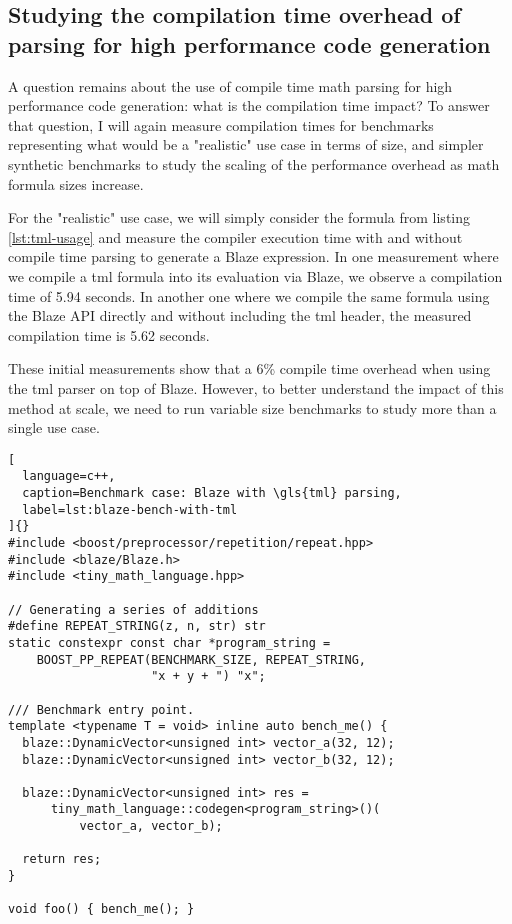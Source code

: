 \documentclass[../main]{subfiles}
\begin{document}
\subsection{
  Studying the compilation time overhead of parsing
  for high performance code generation
}

A question remains about the use of compile time math parsing
for high performance code generation: what is the compilation time impact?
To answer that question, I will again measure compilation times for benchmarks
representing what would be a "realistic" use case in terms of size,
and simpler synthetic benchmarks to study the scaling of the
performance overhead as math formula sizes increase.


For the "realistic" use case, we will simply consider the formula from
listing \ref{lst:tml-usage} and measure the compiler execution time
with and without compile time parsing to generate a Blaze expression.
In one measurement where we compile a \gls{tml} formula into its evaluation
via Blaze, we observe a compilation time of 5.94 seconds.
In another one where we compile the same formula using the Blaze API directly
and without including the \gls{tml} header, the measured compilation time is
5.62 seconds.

These initial measurements show that a 6\% compile time overhead when using
the \gls{tml} parser on top of Blaze.
However, to better understand the impact of this method at scale,
we need to run variable size benchmarks to study more than a single use case.

\clearpage%

\begin{lstlisting}[
  language=c++,
  caption=Benchmark case: Blaze with \gls{tml} parsing,
  label=lst:blaze-bench-with-tml
]{}
#include <boost/preprocessor/repetition/repeat.hpp>
#include <blaze/Blaze.h>
#include <tiny_math_language.hpp>

// Generating a series of additions
#define REPEAT_STRING(z, n, str) str
static constexpr const char *program_string =
    BOOST_PP_REPEAT(BENCHMARK_SIZE, REPEAT_STRING,
                    "x + y + ") "x";

/// Benchmark entry point.
template <typename T = void> inline auto bench_me() {
  blaze::DynamicVector<unsigned int> vector_a(32, 12);
  blaze::DynamicVector<unsigned int> vector_b(32, 12);

  blaze::DynamicVector<unsigned int> res =
      tiny_math_language::codegen<program_string>()(
          vector_a, vector_b);

  return res;
}

void foo() { bench_me(); }
\end{lstlisting}
\end{document}
